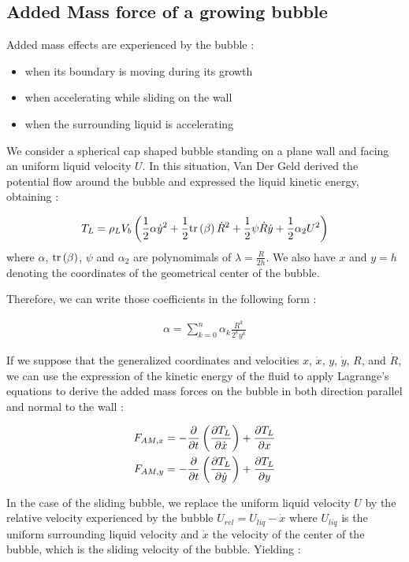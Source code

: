 \subsection{Added Mass force of a growing bubble}

Added mass effects are experienced by the bubble :

\begin{itemize}
\item when its boundary is moving during its growth
\item when accelerating while sliding on the wall 
\item when the surrounding liquid is accelerating
\end{itemize}

We consider a spherical cap shaped bubble standing on a plane wall and facing an uniform liquid velocity $U$. In this situation, Van Der Geld derived the potential flow around the bubble and expressed the liquid kinetic energy, obtaining : 

\begin{align}
T_{L}=\rho_{L}V_{b}\left(  \frac{1}{2}\alpha \dot{y}^{2} + \frac{1}{2} \mathrm{tr}\left( \beta \right)\dot{R}^{2}+\frac{1}{2}\psi \dot{R}\dot{y} + \frac{1}{2} \alpha_{2} U^{2}  \right)
\end{align}
where $\alpha$, $\mathrm{tr}\left( \beta \right)$, $\psi$ and $\alpha_{2}$ are polynomimals of $\lambda = \frac{R}{2h}$. We also have $x$ and $y=h$ denoting the coordinates of the geometrical center of the bubble.

Therefore, we can write those coefficients in the following form : 

\begin{align}
\alpha = \sum_{k=0}^{n}\alpha_{k}\frac{R^{k}}{2^{k}y^{k}}
\end{align}

If we suppose that the generalized coordinates and velocities $x$, $\dot{x}$, $y$, $\dot{y}$, $R$, and $\dot{R}$, we can use the expression of the kinetic energy of the fluid to apply Lagrange's equations to derive the added mass forces on the bubble in both direction parallel and normal to the wall :

\begin{align}
F_{AM,x}&=-\frac{\partial }{\partial t}\left( \frac{\partial T_{L}}{\partial \dot{x}} \right)+\frac{\partial T_{L}}{\partial x}\\
F_{AM,y}&=-\frac{\partial }{\partial t}\left( \frac{\partial T_{L}}{\partial \dot{y}} \right)+\frac{\partial T_{L}}{\partial y}
\end{align}

In the case of the sliding bubble, we replace the uniform liquid velocity $U$ by the relative velocity experienced by the bubble $U_{rel}=U_{liq}-\dot{x}$ where $U_{liq}$ is the uniform surrounding liquid velocity and $\dot{x}$ the velocity of the center of the bubble, which is the sliding velocity of the bubble. Yielding :



